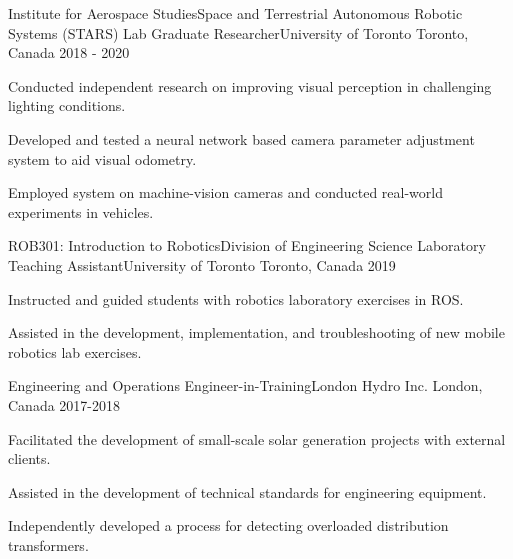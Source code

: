 

\begin{cventries}

  \cventry
    {Institute for Aerospace Studies{\enskip\cdotp\enskip}Space and Terrestrial Autonomous Robotic Systems (STARS) Lab} %
    {Graduate Researcher{\enskip\cdotp\enskip}University of Toronto} %
    {Toronto, Canada} %
    {2018 - 2020} %
    {
      \begin{cvitems} %
        \item {Conducted independent research on improving visual perception in challenging lighting conditions.}
        \item {Developed and tested a neural network based camera parameter adjustment system to aid visual odometry.}
        \item {Employed system on machine-vision cameras and conducted real-world experiments in vehicles.}
      \end{cvitems}
    }
    
  \cventry
    {ROB301: Introduction to Robotics{\enskip\cdotp\enskip}Division of Engineering Science} %
    {Laboratory Teaching Assistant{\enskip\cdotp\enskip}University of Toronto} %
    {Toronto, Canada} %
    {2019} %
    {
      \begin{cvitems} %
        \item {Instructed and guided students with robotics laboratory exercises in ROS.}
        \item {Assisted in the development, implementation, and troubleshooting of new mobile robotics lab exercises.}
      \end{cvitems}
    }
    
  \cventry
	{Engineering and Operations} %
	{Engineer-in-Training{\enskip\cdotp\enskip}London Hydro Inc.} %
	{London, Canada} %
	{2017-2018} %
	{
	  \begin{cvitems} %
	  	\item {Facilitated the development of small-scale solar generation projects with external clients.}
        \item {Assisted in the development of technical standards for engineering equipment.}
        \item {Independently developed a process for detecting overloaded distribution transformers.}
	  \end{cvitems}
    }

\end{cventries}
